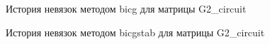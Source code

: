 \begin{figure}[H]
    \renewcommand{\figurename}{Рисунок}
    \caption{История невязок методом bicg для матрицы G2\_circuit}
    \label{fig:image_44}
\end{figure}

\begin{figure}[H]
    \renewcommand{\figurename}{Рисунок}
    \caption{История невязок методом bicgstab для матрицы G2\_circuit}
    \label{fig:image_45}
\end{figure}

